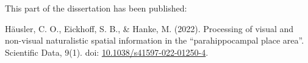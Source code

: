 This part of the dissertation has been published:

\bigbreak

\noindent
%
Häusler, C. O.,
%
Eickhoff, S. B.,
%
\& Hanke, M.
%
(2022).
%
Processing of visual and non-visual naturalistic spatial information in the
``parahippocampal place area''.
%
Scientific Data, 9(1).
%
doi: \href{https://doi.org/10.1038/s41597-022-01250-4}
{10.1038/s41597-022-01250-4}.

